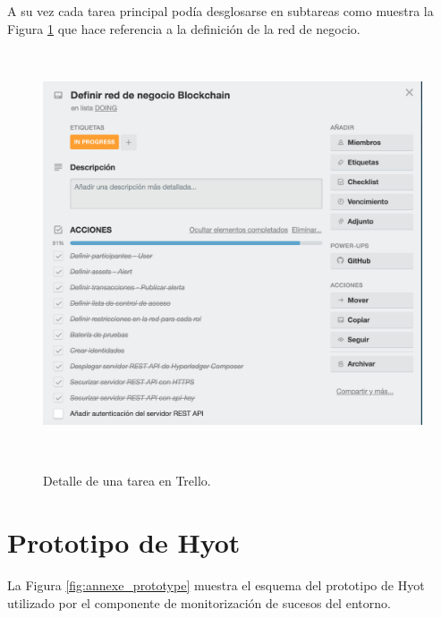 \documentclass[12pt,a4paper, twoside]{report}
\begin{document}
	A su vez cada tarea principal podía desglosarse en subtareas como muestra la Figura \ref{fig:annexe_trello_detail} que hace referencia a la definición de la red de negocio.

	\begin{figure}[!ht]   
		\caption{Detalle de una tarea en Trello.} 
		\begin{center} 
			\includegraphics[width=16cm,height=12cm]{Images/trello/trello_tarjeta} \\
			\label{fig:annexe_trello_detail} 
		\end{center}  
	\end{figure} 
			
	\chapter{Prototipo de Hyot}\label{prototype}
	
	La Figura \ref{fig:annexe_prototype} muestra el esquema del \gls{prototipo} de Hyot utilizado por el componente de monitorización de sucesos del entorno.
	
\end{document}
